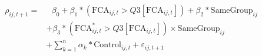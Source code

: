 \begin{equation}
\begin{split}
\rho_{ij,t+1} = & \text{ 	}\beta_0 + \beta_1* (\text{FCA}_{ij,t} > Q3[\text{FCA}_{ij,t}])  + \beta_2 * \text{SameGroup}_{ij}  \\
& +  \beta_3* (\text{FCA}^*_{ij,t} > Q3[\text{FCA}_{ij,t}]) \times \text{SameGroup}_{ij}   \\
  & + \sum_{k=1} ^{n} \alpha_k*\text{Control}_{ij,t} + \varepsilon_{ij,t+1}
\end{split}
\label{model2}
\end{equation}